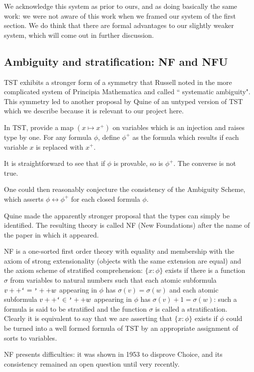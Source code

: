 \documentclass[12pt]{article}
\begin{document}
We acknowledge this system as prior to ours, and as doing basically the same work:  we were not aware of this work when we framed our system of the first section.  We do think that there are formal advantages to our slightly weaker system, which will come out in further discussion.

\subsection{Ambiguity and stratification:  NF and NFU}

TST exhibits a stronger form of a symmetry that Russell noted in the more complicated system of
Principia Mathematica and called `` systematic ambiguity".  This symmetry led to another proposal by Quine of an untyped version of TST which we describe because it is relevant to our project here.

In TST, provide a map $(x \mapsto x^+)$ on variables which is an injection and raises type by one.
For any formula $\phi$, define $\phi^+$ as the formula which results if each variable $x$ is replaced with $x^+$.

It is straightforward to see that if $\phi$ is provable, so is $\phi^+$.  The converse is not true.

One could then reasonably conjecture the consistency of the Ambiguity Scheme, which asserts
$\phi \leftrightarrow \phi^+$ for each closed formula $\phi$.

Quine made the apparently stronger proposal that the types can simply be identified.  The resulting theory is called NF (New Foundations) after the name of the paper in which it appeared.

NF is a one-sorted first order theory with equality and membership with the axiom of strong extensionality
(objects with the same extension are equal) and the axiom scheme of stratified comprehension:  $\{x:\phi\}$ exists if there is a function $\sigma$ from variables to natural numbers such that each atomic subformula
$v++\verb|`|=\verb|'|++w$ appearing in $\phi$ has $\sigma(v)=\sigma(w)$ and each atomic subformula
$v++\verb|`|\in\verb|'|++w$ appearing in $\phi$ has $\sigma(v)+1=\sigma(w)$: such a formula is said to be stratified and the function $\sigma$ is called a stratification.  Clearly it is equivalent to say that we are asserting that $\{x:\phi\}$ exists if $\phi$ could be turned into a well formed formula of TST by an appropriate assignment of sorts to variables.

NF presents difficulties:  it was shown in 1953 to disprove Choice, and its consistency remained an open question until very recently.
\end{document}
